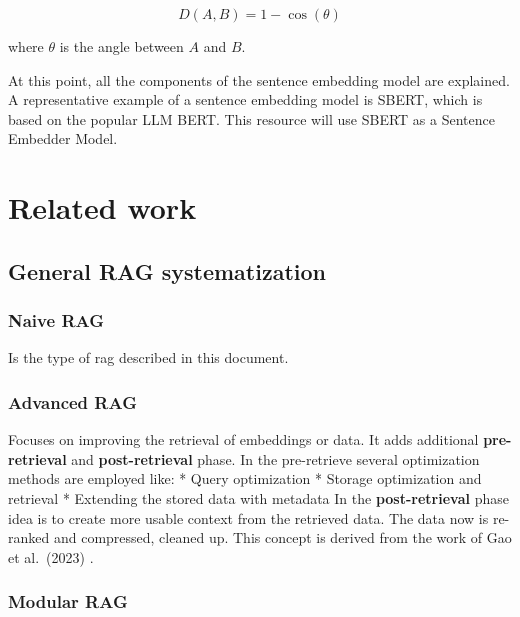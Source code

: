 \documentclass{wseas}
\begin{document}

\begin{equation}
  D(A, B) = 1 - \cos(\theta)
\end{equation}

where \(\theta\) is the angle between \(A\) and \(B\).

At this point, all the components of the sentence embedding model are
explained. A representative example of a sentence embedding model is
SBERT, which is based on the popular LLM BERT. This resource will use
SBERT as a Sentence Embedder Model.


\section{Related work}

\subsection{General RAG
systematization}

\subsubsection{Naive RAG}

Is the type of rag described in this document.

\subsubsection{Advanced RAG}

Focuses on improving the retrieval of embeddings or data. It adds
additional \textbf{pre-retrieval} and \textbf{post-retrieval} phase. In
the pre-retrieve several optimization methods are employed like: 
* Query
optimization * Storage optimization and retrieval * Extending the stored
data with metadata In the \textbf{post-retrieval} phase idea is to
create more usable context from the retrieved data. The data now is
re-ranked and compressed, cleaned up. This concept is derived from the
work of Gao et al.~(2023) \cite{cite4}.

\subsubsection{Modular RAG}
\end{document}
